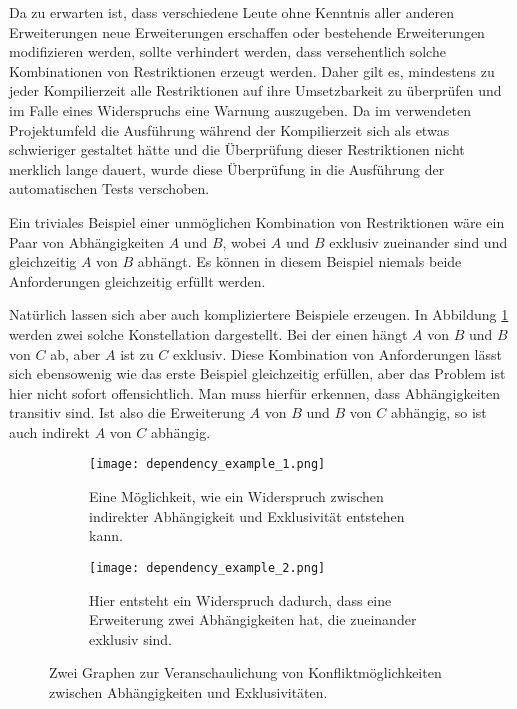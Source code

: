 Da zu erwarten ist, dass verschiedene Leute ohne Kenntnis aller anderen Erweiterungen neue Erweiterungen erschaffen oder bestehende Erweiterungen modifizieren werden, sollte verhindert werden, dass versehentlich solche Kombinationen von Restriktionen erzeugt werden. Daher gilt es, mindestens zu jeder Kompilierzeit alle Restriktionen auf ihre Umsetzbarkeit zu überprüfen und im Falle eines Widerspruchs eine Warnung auszugeben. Da im verwendeten Projektumfeld die Ausführung während der Kompilierzeit sich als etwas schwieriger gestaltet hätte und die Überprüfung dieser Restriktionen nicht merklich lange dauert, wurde diese Überprüfung in die Ausführung der automatischen Tests verschoben.

Ein triviales Beispiel einer unmöglichen Kombination von Restriktionen wäre ein Paar von Abhängigkeiten $A$ und $B$, wobei $A$ und $B$ exklusiv zueinander sind und gleichzeitig $A$ von $B$ abhängt. Es können in diesem Beispiel niemals beide Anforderungen gleichzeitig erfüllt werden.

Natürlich lassen sich aber auch kompliziertere Beispiele erzeugen. In Abbildung \ref{fig:impl:dependency_conflict_examples} werden zwei solche Konstellation dargestellt. Bei der einen hängt $A$ von $B$ und $B$ von $C$ ab, aber $A$ ist zu $C$ exklusiv. Diese Kombination von Anforderungen lässt sich ebensowenig wie das erste Beispiel gleichzeitig erfüllen, aber das Problem ist hier nicht sofort offensichtlich. Man muss hierfür erkennen, dass Abhängigkeiten transitiv sind. Ist also die Erweiterung $A$ von $B$ und $B$ von $C$ abhängig, so ist auch indirekt $A$ von $C$ abhängig.

  \begin{figure}
		\centering
		\begin{subfigure}[a]{0.4\linewidth}
			\texttt{[image: dependency\_example\_1.png]}
      		\caption{Eine Möglichkeit, wie ein Widerspruch zwischen indirekter Abhängigkeit und Exklusivität entstehen kann.}
		\end{subfigure}
		\begin{subfigure}[a]{0.4\linewidth}
			\texttt{[image: dependency\_example\_2.png]}
      		\caption{Hier entsteht ein Widerspruch dadurch, dass eine Erweiterung zwei Abhängigkeiten hat, die zueinander exklusiv sind.}
		\end{subfigure}
		\caption{Zwei Graphen zur Veranschaulichung von Konfliktmöglichkeiten zwischen Abhängigkeiten und Exklusivitäten.}
		\label{fig:impl:dependency_conflict_examples}
  \end{figure}

